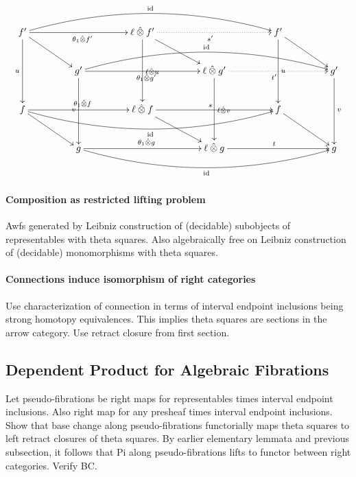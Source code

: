 \documentclass[reqno,10pt,a4paper,oneside]{amsart}
\begin{document}
\[
\xymatrix@C+2em{
  f'
  \ar[rr]_{\thetar \hatotimes f'}
  \ar[dd]_{u}
  \ar@/^2em/[rrrr]^{\id}
  \ar[dr]
&&
  \intervall \hatotimes f'
  \ar@{.>}[rr]_{s'}
  \ar[dd]^{\intervall \hatotimes u}
  \ar[dr]
&&
  f'
  \ar[dd]^{u}
  \ar[dr]
\\&
  g'
  \ar[rr]_{\thetar \hatotimes g'}
  \ar[dd]_{v}
  \ar@/^2em/[rrrr]^{\id}
&&
  \intervall \hatotimes g'
  \ar@{.>}[rr]_{t'}
  \ar[dd]^{\intervall \hatotimes v}
&&
  g'
  \ar[dd]^{v}
\\
  f
  \ar[rr]^{\thetar \hatotimes f}
  \ar@/_2em/[rrrr]_{\id}
  \ar[dr]
&&
  \intervall \hatotimes f
  \ar[rr]^{s}
  \ar[dr]
&&
  f
  \ar[dr]
\\&
  g
  \ar[rr]^{\thetar \hatotimes g}
  \ar@/_2em/[rrrr]_{\id}
&&
  \intervall \hatotimes g
  \ar[rr]^{t}
&&
  g
}
\]


\paragraph{Composition as restricted lifting problem}

Awfs generated by Leibniz construction of (decidable) subobjects of representables with theta squares.
Also algebraically free on Leibniz construction of (decidable) monomorphisms with theta squares.

\paragraph{Connections induce isomorphism of right categories}

Use characterization of connection in terms of interval endpoint inclusions being strong homotopy equivalences.
This implies theta squares are sections in the arrow category.
Use retract closure from first section.

\subsection{Dependent Product for Algebraic Fibrations}

Let pseudo-fibrations be right maps for representables times interval endpoint inclusions.
Also right map for any presheaf times interval endpoint inclusions.
Show that base change along pseudo-fibrations functorially maps theta squares to left retract closures of theta squares.
By earlier elementary lemmata and previous subsection, it follows that Pi along pseudo-fibrations lifts to functor between right categories.
Verify BC.




\end{document}

